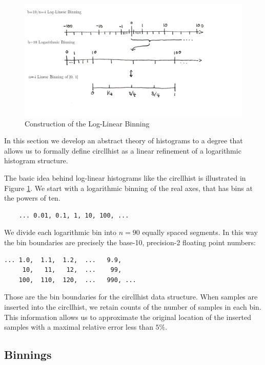 \documentclass{article}
\theoremstyle{plain}
\theoremstyle{remark}
\begin{document}
\begin{figure}
  \includegraphics[width=\textwidth]{assets/LLBins.png}
  \caption{Construction of the Log-Linear Binning}
  \label{fig:llbins}
\end{figure}

In this section we develop an abstract theory of histograms to a degree that allows us to
formally define circllhist as a linear refinement of a logarithmic histogram structure.

The basic idea behind log-linear histograms like the circllhist is illustrated in Figure \ref{fig:llbins}.
We start with a logarithmic binning of the real axes, that has bins at the powers of ten.
\begin{center}
  \begin{BVerbatim}
    ... 0.01, 0.1, 1, 10, 100, ...
  \end{BVerbatim}
\end{center}
We divide each logarithmic bin into $n=90$ equally spaced segments. In this way the bin boundaries
are precisely the base-10, precision-2 floating point numbers:
\begin{center}
\begin{BVerbatim}
... 1.0,  1.1,  1.2,  ...   9.9,
     10,   11,   12,  ...    99,
    100,  110,  120,  ...   990, ...
\end{BVerbatim}
\end{center}
Those are the bin boundaries for the circllhist data structure.
When samples are inserted into the circllhist, we retain counts of the number of samples in each bin.
This information allows us to approximate the original location of the inserted samples with a
maximal relative error less than $5\%$.

\subsection{Binnings}
\end{document}
